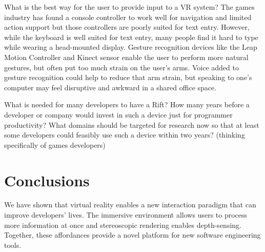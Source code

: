 \documentclass{acm_proc_article-sp}
\begin{document}


What is the best way for the user to provide input to a VR system? The games industry has found a console controller to work well for navigation and limited action support but those controllers are poorly suited for text entry. However, while the keyboard is well suited for text entry, many people find it hard to type while wearing a head-mounted display. Gesture recognition devices like the Leap Motion Controller and Kinect sensor enable the user to perform more natural gestures, but often put too much strain on the user's arms. Voice added to gesture recognition could help to reduce that arm strain, but speaking to one's computer may feel disruptive and awkward in a shared office space.

What is needed for many developers to have a Rift? How many years before a developer or company would invest in such a device just for programmer productivity? What domains should be targeted for research now so that at least some developers could feasibly use such a device within two years? (thinking specifically of games developers)

\section{Conclusions}
We have shown that virtual reality enables a new interaction paradigm that can improve developers' lives. The immersive environment allows users to process more information at once and stereoscopic rendering enables depth-sensing. Together, these affordances provide a novel platform for new software engineering tools.




\end{document}
